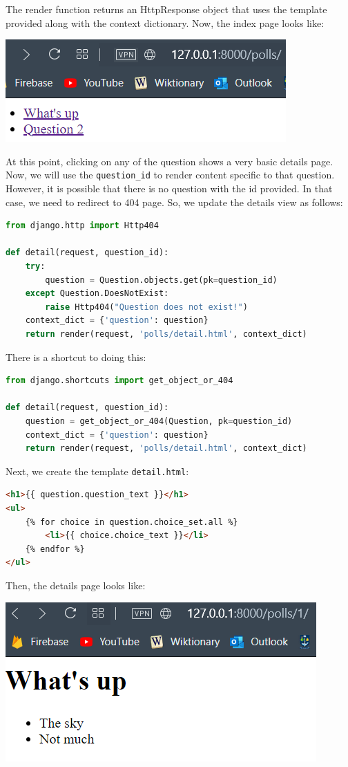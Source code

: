 \documentclass[a4paper, openany]{memoir}
\begin{document}
    The render function returns an HttpResponse object that uses the template provided along with the context dictionary. Now, the index page looks like:
    \begin{center}
        \includegraphics[scale=0.7]{src/Django8.PNG}
    \end{center}
    At this point, clicking on any of the question shows a very basic details page. Now, we will use the \texttt{question\_id} to render content specific to that question. However, it is possible that there is no question with the id provided. In that case, we need to redirect to 404 page. So, we update the details view as follows:
\begin{lstlisting}[language=python]
from django.http import Http404

def detail(request, question_id):
    try:
        question = Question.objects.get(pk=question_id)
    except Question.DoesNotExist:
        raise Http404("Question does not exist!")
    context_dict = {'question': question}
    return render(request, 'polls/detail.html', context_dict)
\end{lstlisting}
    There is a shortcut to doing this:
\begin{lstlisting}[language=python]
from django.shortcuts import get_object_or_404

def detail(request, question_id):
    question = get_object_or_404(Question, pk=question_id)
    context_dict = {'question': question}
    return render(request, 'polls/detail.html', context_dict)
\end{lstlisting}
    Next, we create the template \texttt{detail.html}:
\begin{lstlisting}[language=html]
<h1>{{ question.question_text }}</h1>
<ul>
    {% for choice in question.choice_set.all %}
        <li>{{ choice.choice_text }}</li>
    {% endfor %}
</ul>
\end{lstlisting}
    Then, the details page looks like:
    \begin{center}
        \includegraphics[scale=0.7]{src/Django9.PNG}
    \end{center}
\end{document}
